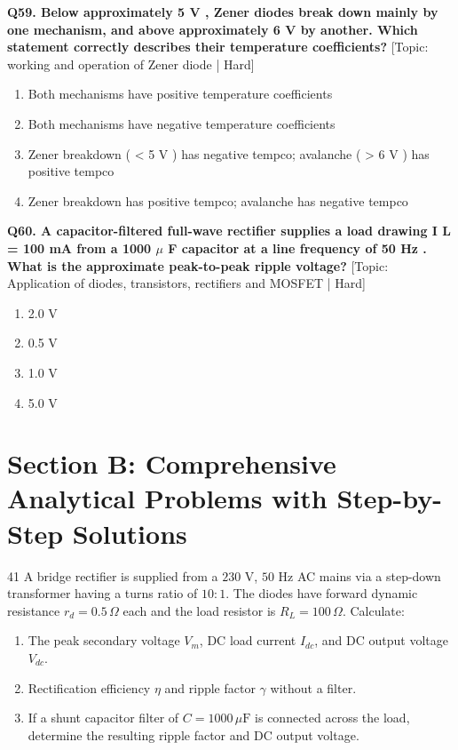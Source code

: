 \noindent\textbf{Q59. Below approximately 5 V , Zener diodes break down mainly by one mechanism, and above approximately 6 V by another. Which statement correctly describes their temperature coefficients?} \hfill [Topic: working and operation of Zener diode | Hard]
\begin{enumerate}[label=(\alph*),topsep=2pt,itemsep=1pt,partopsep=0pt,parsep=0pt]
    \item {Both mechanisms have positive temperature coefficients}
    \item {Both mechanisms have negative temperature coefficients}
    \item {Zener breakdown ( < 5 V ) has negative tempco; avalanche ( > 6 V ) has positive tempco}
    \item {Zener breakdown has positive tempco; avalanche has negative tempco}
\end{enumerate}
\vspace{2mm}

\noindent\textbf{Q60. A capacitor-filtered full-wave rectifier supplies a load drawing I L = 100 mA from a 1000 $\mu$ F capacitor at a line frequency of 50 Hz . What is the approximate peak-to-peak ripple voltage?} \hfill [Topic: Application of diodes, transistors, rectifiers and MOSFET | Hard]
\begin{enumerate}[label=(\alph*),topsep=2pt,itemsep=1pt,partopsep=0pt,parsep=0pt]
    \item {2.0 V}
    \item {0.5 V}
    \item {1.0 V}
    \item {5.0 V}
\end{enumerate}
\vspace{2mm}


\newpage
\section{Section B: Comprehensive Analytical Problems with Step-by-Step Solutions}

\begin{subjectiveq}{4}{1}
A bridge rectifier is supplied from a $230\text{ V}$, $50\text{ Hz}$ AC mains via a step-down transformer having a turns ratio of $10:1$. The diodes have forward dynamic resistance $r_d = 0.5\,\Omega$ each and the load resistor is $R_L = 100\,\Omega$. Calculate:\begin{enumerate}[label=(\alph*)]\item The peak secondary voltage $V_m$, DC load current $I_{dc}$, and DC output voltage $V_{dc}$.\item Rectification efficiency $\eta$ and ripple factor $\gamma$ without a filter.\item If a shunt capacitor filter of $C = 1000\,\mu\text{F}$ is connected across the load, determine the resulting ripple factor and DC output voltage.\end{enumerate}
\end{subjectiveq}

